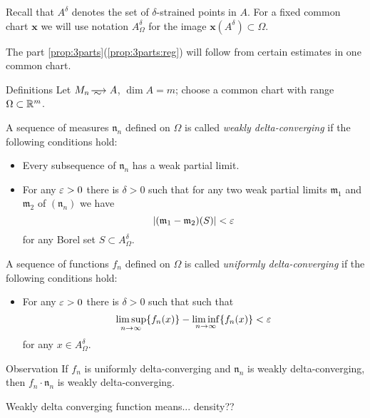 Recall that $A^\delta$ denotes the set of $\delta$-strained points in $A$.
For a fixed common chart $\bm{x}$ we will use notation $A^\delta_\Omega$ for the image $\bm{x}(A^\delta)\subset \Omega$.

The part \ref{prop:3parts}(\ref{prop:3parts:reg}) will follow from certain estimates in one common chart.

\begin{thm}{Definitions}\label{def:delta-converge}
Let $M_n\smooths{} A$, $\dim A=m$;
choose a common chart with range $\Omega\subset \mathbb{R}^m$.

A sequence of measures $\mathfrak n_n$ defined on $\Omega$ is called \emph{weakly delta-converging}
if the following conditions hold:
\begin{itemize}
 \item Every subsequence of $\mathfrak n_n$ has a weak partial limit.
 \item For any $\varepsilon>0$ there is $\delta>0$ such that for any two weak partial limits $\mathfrak m_1$ and $\mathfrak m_2$ of $(\mathfrak n_n)$ we have  
\[|(\mathfrak m_1-\mathfrak m_2)(S)|<\varepsilon\]
for any Borel set $S\subset A^\delta_\Omega$.
\end{itemize}

A sequence of functions $f_n$ defined on $\Omega$ is called \emph{uniformly delta-converging}
if the following conditions hold:
\begin{itemize}
 \item For any $\varepsilon>0$ there is $\delta>0$ such that such that 
\[\limsup_{n\to\infty} \{f_n(x)\}-\liminf_{n\to\infty}\{f_n(x)\}<  \varepsilon\]
for any $x\in A^\delta_\Omega$.
\end{itemize}

\end{thm}

\begin{thm}{Observation}\label{obs:delta-weak-uniform}
If $f_n$ is uniformly delta-converging and $\mathfrak n_n$ is weakly delta-converging,
then $f_n\cdot \mathfrak n_n$ is weakly delta-converging.
\end{thm}

{\color{blue}
Weakly delta converging function means... density??}




